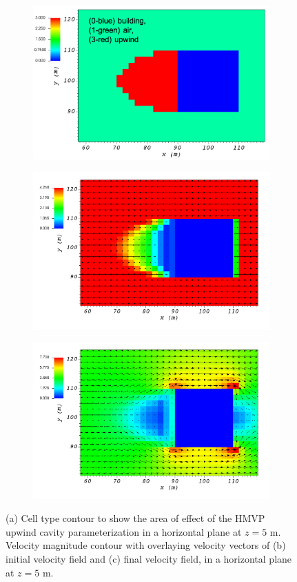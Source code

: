 \begin{figure}[H]
    \centering
    \begin{subfigure}{\textwidth}
    \centering
    \includegraphics[width=10.3cm,keepaspectratio]{Images/upwind_z_5_3_init_icell.png}
    \caption{}
    \end{subfigure}
    \begin{subfigure}{\textwidth}
    \centering
    \includegraphics[width=11.0cm,keepaspectratio]{Images/upwind_z_5_3_init_vel.png}
    \caption{}
    \end{subfigure}
    \begin{subfigure}{\textwidth}
    \centering
    \includegraphics[width=11.0cm,keepaspectratio]{Images/upwind_z_5_3_final.png}
    \caption{}
    \end{subfigure}
    \caption{(a) Cell type contour to show the area of effect of the HMVP upwind cavity parameterization in a horizontal plane at $z=5$ m. Velocity magnitude contour with overlaying velocity vectors of (b) initial velocity field and (c) final velocity field, in a horizontal plane at $z=5$ m.}
\end{figure}

